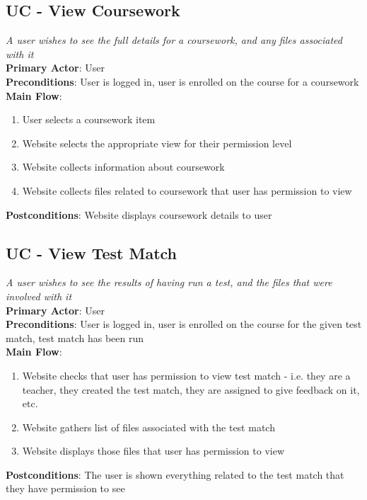 \documentclass[a4paper,11pt]{report}
\begin{document}
\subsection*{UC - View Coursework}
\textit{A user wishes to see the full details for a coursework, and any files associated with it}\\
\textbf{Primary Actor}: User\\
\textbf{Preconditions}: User is logged in, user is enrolled on the course for a coursework\\
\textbf{Main Flow}:
\begin{enumerate}
\item User selects a coursework item
\item Website selects the appropriate view for their permission level
\item Website collects information about coursework
\item Website collects files related to coursework that user has permission to view
\end{enumerate}
\textbf{Postconditions}: Website displays coursework details to user

\subsection*{UC - View Test Match}
\textit{A user wishes to see the results of having run a test, and the files that were involved with it}\\
\textbf{Primary Actor}: User\\
\textbf{Preconditions}: User is logged in, user is enrolled on the course for the given test match, test match has been run\\
\textbf{Main Flow}:
\begin{enumerate}
\item Website checks that user has permission to view test match - i.e. they are a teacher, they created the test match, they are assigned to give feedback on it, etc.
\item Website gathers list of files associated with the test match
\item Website displays those files that user has permission to view
\end{enumerate}
\textbf{Postconditions}: The user is shown everything related to the test match that they have permission to see
\end{document}
